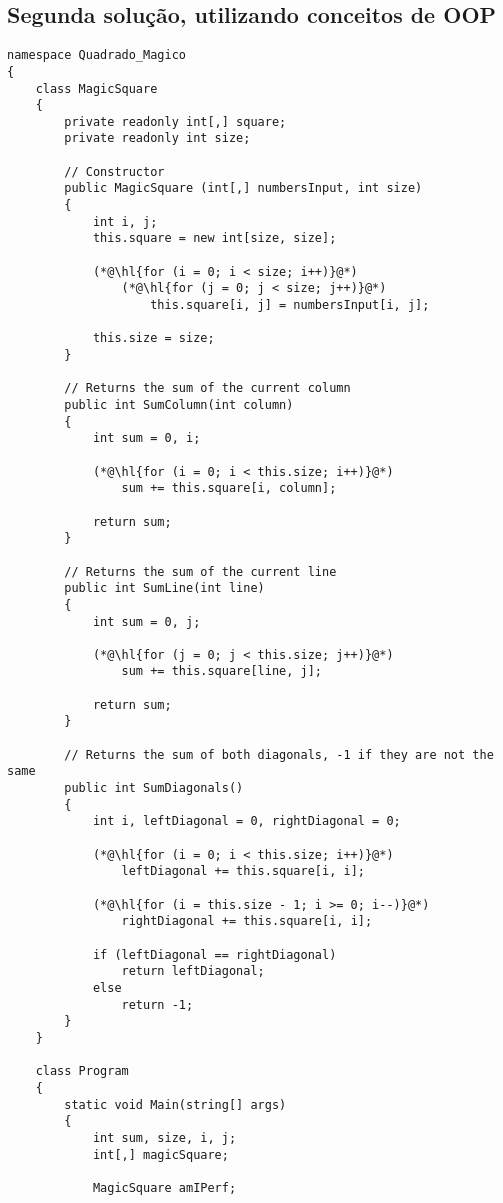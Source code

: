 \documentclass {article}
\begin{document}
    \subsection{Segunda solução, utilizando conceitos de OOP}
    \begin{lstlisting}
namespace Quadrado_Magico
{
    class MagicSquare
    {
        private readonly int[,] square;
        private readonly int size;

        // Constructor
        public MagicSquare (int[,] numbersInput, int size)
        {
            int i, j;
            this.square = new int[size, size];

            (*@\hl{for (i = 0; i < size; i++)}@*)
                (*@\hl{for (j = 0; j < size; j++)}@*)
                    this.square[i, j] = numbersInput[i, j];

            this.size = size;
        }

        // Returns the sum of the current column
        public int SumColumn(int column)
        {
            int sum = 0, i;

            (*@\hl{for (i = 0; i < this.size; i++)}@*)
                sum += this.square[i, column];

            return sum;
        }

        // Returns the sum of the current line
        public int SumLine(int line)
        {
            int sum = 0, j;

            (*@\hl{for (j = 0; j < this.size; j++)}@*)
                sum += this.square[line, j];

            return sum;
        }

        // Returns the sum of both diagonals, -1 if they are not the same
        public int SumDiagonals()
        {
            int i, leftDiagonal = 0, rightDiagonal = 0;

            (*@\hl{for (i = 0; i < this.size; i++)}@*)
                leftDiagonal += this.square[i, i];

            (*@\hl{for (i = this.size - 1; i >= 0; i--)}@*)
                rightDiagonal += this.square[i, i];

            if (leftDiagonal == rightDiagonal)
                return leftDiagonal;
            else
                return -1;
        }
    }

    class Program
    {
        static void Main(string[] args)
        {
            int sum, size, i, j;
            int[,] magicSquare;

            MagicSquare amIPerf;


\end{lstlisting}
\end{document}
